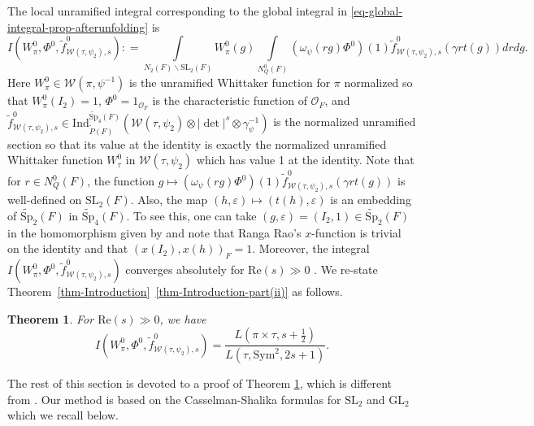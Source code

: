 \documentclass[11pt]{amsart}
\newtheorem{theorem}{Theorem}[section]
\theoremstyle{definition}
\theoremstyle{remark}
\newcommand{\GL}{\mathrm{GL}}
\newcommand{\SL}{\mathrm{SL}}
\begin{document}
The local unramified integral corresponding to the global integral in \eqref{eq-global-integral-prop-afterunfolding} is 
\begin{equation*}
I(W_\pi^0, \Phi^0, \tilde{f}^0_{\mathcal{W}(\tau,\psi_2), s} ) : =  \int\limits_{N_2(F)\backslash \mathrm{SL}_2(F)} W^0_\pi(g)  \int\limits_{N_Q^0(F)} \left(\omega_\psi(rg)\Phi^0\right)(1) \tilde{f}^0_{\mathcal{W}(\tau,\psi_2), s}  \left( \gamma r t(g)  \right) dr dg.
\end{equation*}
Here $W^0_\pi\in \mathcal{W}(\pi, \psi^{-1})$ is the unramified Whittaker function for $\pi$ normalized so that $W_\pi^0(I_2)=1$,  $\Phi^0=\text{1}_{\mathcal{O}_F}$ is the characteristic function of $\mathcal{O}_F$, and 
$\tilde{f}_{\mathcal{W}(\tau,\psi_2), s} ^0 \in  \mathrm{Ind}_{\widetilde{P}(F)}^{\widetilde{\mathrm{Sp}}_4(F)}(\mathcal{W}(\tau, \psi_2) \otimes   |\det|^s \otimes \gamma_\psi^{-1} )$ is the normalized unramified section so that its value at the identity is exactly the normalized unramified Whittaker function $W_\tau^0$ in $\mathcal{W}(\tau, \psi_2)$ which has value 1 at the identity. Note that for $r\in N_Q^0(F)$, the function $g\mapsto \left(\omega_\psi(rg)\Phi^0\right)(1) \tilde{f}^0_{\mathcal{W}(\tau,\psi_2), s}  \left( \gamma r t(g)  \right)$ is well-defined on $\SL_2(F)$. Also, the map $(h, \varepsilon)\mapsto (t(h), \varepsilon)$ is an embedding of $\widetilde{\mathrm{Sp}}_2(F)$ in $\widetilde{\mathrm{Sp}}_4(F)$. To see this, one can take $(g, \varepsilon)=(I_2, 1)\in \widetilde{\mathrm{Sp}}_2(F)$ in the homomorphism given by \cite[(1.28)]{GinzburgSoudry2021} and note that Ranga Rao's $x$-function is trivial on the identity and that $(x(I_2), x(h))_F=1$. Moreover, the integral $I(W_\pi^0, \Phi^0, \tilde{f}^0_{\mathcal{W}(\tau,\psi_2), s} )$ converges absolutely for $\mathrm{Re}(s)\gg 0$  \cite[Proposition 6.5]{GinzburgRallisSoudry1998}. We re-state Theorem~\ref{thm-Introduction}~\ref{thm-Introduction-part(ii)} as follows.

\begin{theorem}\cite[Theorem 6.3]{GinzburgRallisSoudry1998}
For $\mathrm{Re}(s)\gg 0$, we have
\begin{equation}
I(W_\pi^0, \Phi^0, \tilde{f}^0_{\mathcal{W}(\tau,\psi_2), s} ) = \frac{L(\pi\times \tau, s+\frac{1}{2}) }{L(\tau, \mathrm{Sym}^2, 2s+1)} .
\label{eq-local-unramified-main-result}
\end{equation}
\label{thm-local-unramified-main-result}
\end{theorem}

The rest of this section is devoted to a proof of Theorem \ref{thm-local-unramified-main-result}, which is different from \cite{GinzburgRallisSoudry1998}. Our method is based on the Casselman-Shalika formulas for $\SL_2$ and $\GL_2$ which we recall below.
\end{document}
